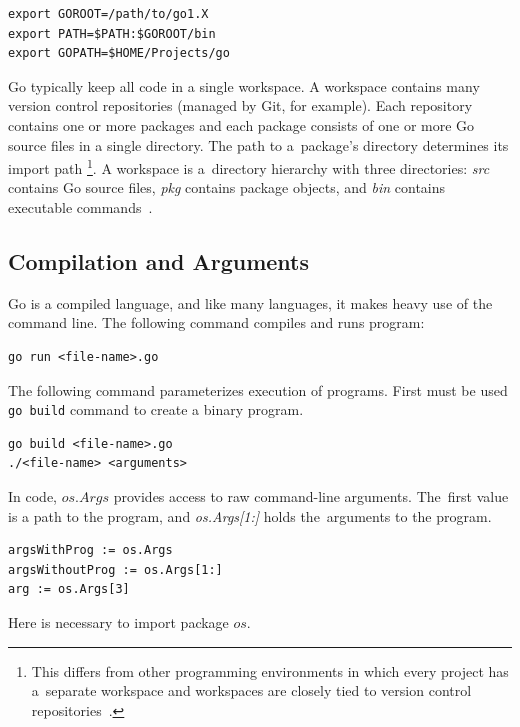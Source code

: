 \documentclass[
  oneside, 12pt, 
  printed, %
  notable,   %
  nolof,     %
  nolot,     %
]{fithesis3}
\begin{document}
\begin{lstlisting}
export GOROOT=/path/to/go1.X
export PATH=$PATH:$GOROOT/bin
export GOPATH=$HOME/Projects/go
\end{lstlisting}
Go typically keep all code in a single workspace. A workspace contains many version control 
repositories (managed by Git, for example). Each repository contains one or more packages and each 
package consists of one or more Go source files in a single directory. The path to a~package's 
directory determines its import path \footnote{This differs from other programming environments in 
which every project has a~separate workspace and workspaces are closely tied to version control 
repositories~\cite{howtowritegocode}.}. A workspace is a~directory hierarchy with three 
directories: \textit{src} contains Go source files, \textit{pkg} contains package objects, and \textit{bin} contains executable commands~\cite{howtowritegocode}. %

\subsection{Compilation and Arguments}
Go is a compiled language, and like many languages, it makes heavy use of the command line. The following command compiles and runs program:
\begin{lstlisting}
go run <file-name>.go
\end{lstlisting}
The following command parameterizes execution of programs. First must be used \texttt{go build} command to create a binary program.
\begin{lstlisting}
go build <file-name>.go
./<file-name> <arguments>
\end{lstlisting}
In code, $os.Args$ provides access to raw command-line arguments. The~first value is a path to the program, and \textit{os.Args[1:]} holds the~arguments to the program.
\begin{lstlisting}
argsWithProg := os.Args
argsWithoutProg := os.Args[1:]
arg := os.Args[3]
\end{lstlisting}
Here is necessary to import package $os$.
\end{document}
